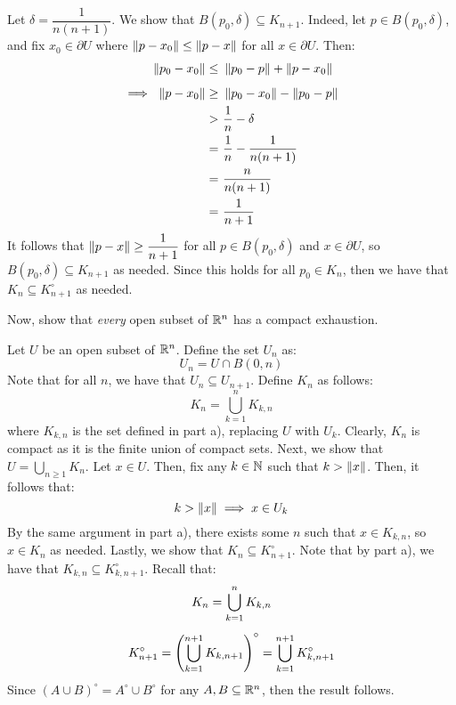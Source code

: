 \begin{soln}
    Let $ \delta = \dfrac{1}{n(n+1)} $. We show that $ B(p_{0}, \delta) \subseteq
    K_{n+1} $. Indeed, let $ p \in B(p_{0}, \delta) $, and fix $ x_{0} \in
    \partial U $ where $ \left\|p - x_{0}\right\| \leq \left\|p - x\right\| $ for all $ x \in
    \partial U $. Then:
    \begin{align*}
        \norm{p_{0} - x_{0}} \leq \ & \norm{p_{0} - p} + \norm{p - x_{0}} \vsp
        \implies \ \norm{p - x_{0}} \geq \ & \norm{p_{0} - x_{0}} - \norm{p_{0}
        - p} \\
        > \ & \frac{1}{n} - \delta \\
        = \ & \frac{1}{n} - \frac{1}{n(n+1)} \\
        = \ & \frac{n}{n(n+1)} \\
        = \ & \frac{1}{n+1}
    \end{align*}
    It follows that $ \left\|p - x\right\| \geq \dfrac{1}{n+1} $ for all $ p \in
    B(p_{0}, \delta) $ and $ x \in \partial U $, so $ B(p_{0}, \delta)
    \subseteq K_{n+1} $ as needed. \vsp
    Since this holds for all $ p_{0} \in K_{n} $, then we have that $ K_{n}
    \subseteq K_{n+1}^{\circ} $ as needed.
\end{soln}

\newpage
\begin{qu}[num=19.2]
    Now, show that \textit{every} open subset of $ \mathbb{R}^{n} $ has a compact
    exhaustion.
\end{qu}

\begin{soln}
    Let $ U $ be an open subset of $ \mathbb{R}^{n} $. Define the set $ U_{n} $ as:
    \begin{equation*}
        U_{n} = U \cap B(0, n)
    \end{equation*}
    Note that for all $ n $, we have that $ U_{n} \subseteq U_{n+1} $.
    Define $ K_{n} $ as follows:
    \begin{equation*}
        K_{n} = \bigcup_{k=1}^{n} K_{k, n}
    \end{equation*}
    where $ K_{k, n} $ is the set defined in part a), replacing $ U $ with
    $ U_{k} $. Clearly, $ K_{n} $ is compact as it is the finite union of compact
    sets. Next, we show that $ U = \bigcup_{n \geq 1} K_{n} $. \vsp
    Let $ x \in U $. Then, fix any $ k \in \mathbb{N} $ such that $ k > \left\|x\right\| $.
    Then, it follows that:
    \begin{equation*}
        k > \left\|x\right\| \implies x \in U_{k}
    \end{equation*}
    By the same argument in part a), there exists some $ n $ such that $ x \in
    K_{k, n} $, so $ x \in K_{n} $ as needed. \vsp
    Lastly, we show that $ K_{n} \subseteq K_{n+1}^{\circ} $.
    Note that by part a), we have that $ K_{k, n} \subseteq K_{k, n+1}^{\circ} $.
    Recall that:
    \begin{gather*}
        K_{n} = \bigcup_{k=1}^{n} K_{k, n} \vsp
        K_{n+1}^{\circ} = \left( \bigcup_{k=1}^{n+1}K_{k,n+1} \right)^{\circ}
        = \bigcup_{k=1}^{n+1}K_{k,n+1}^{\circ}
    \end{gather*}
    Since $ (A \cup B)^{\circ} = A^{\circ} \cup B^{\circ} $ for any
    $ A, B \subseteq \mathbb{R}^{n} $, then the result follows.
\end{soln}
